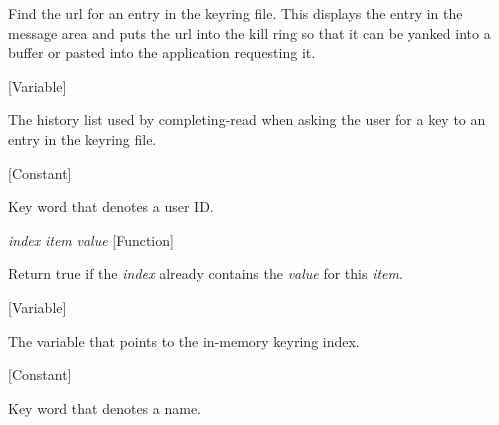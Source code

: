 \begin{doc-string}
Find the url for an entry in the keyring file.  This displays the entry in
the message area and puts the url into the kill ring so that it can be yanked
into a buffer or pasted into the application requesting it.
\end{doc-string}

\vspace{1em}
\noindent
{}
\usebox{\funcname}
 \hfill [Variable]

\begin{doc-string}
The history list used by completing-read when asking the user for a key to an
entry in the keyring file.
\end{doc-string}

\vspace{1em}
\noindent
{}
\usebox{\funcname}
 \hfill [Constant]

\begin{doc-string}
Key word that denotes a user ID.
\end{doc-string}

\vspace{1em}
\noindent
{}
\usebox{\funcname}\emph{index} \emph{item} \emph{value}
 \hfill [Function]

\begin{doc-string}
Return true if the \emph{index} already contains the \emph{value} for this \emph{item}.
\end{doc-string}

\vspace{1em}
\noindent
{}
\usebox{\funcname}
 \hfill [Variable]

\begin{doc-string}
The variable that points to the in-memory keyring index.
\end{doc-string}

\vspace{1em}
\noindent
{}
\usebox{\funcname}
 \hfill [Constant]

\begin{doc-string}
Key word that denotes a name.
\end{doc-string}


